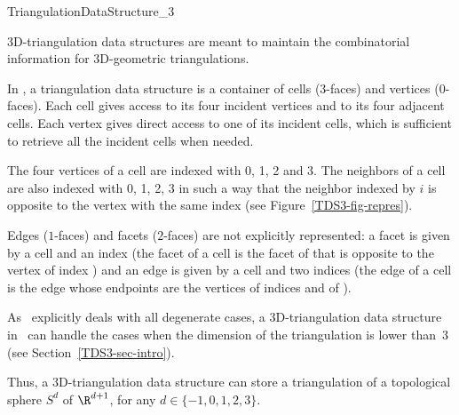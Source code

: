 

\begin{ccRefConcept}{TriangulationDataStructure_3}


\ccDefinition

3D-triangulation data structures are meant to maintain the
combinatorial information for 3D-geometric triangulations.

In \cgal, a triangulation data structure is a
container of cells ($3$-faces) and vertices ($0$-faces). Each cell gives
access to its four incident vertices and to its four adjacent
cells. Each vertex gives direct access to one of its incident cells, which is 
sufficient to retrieve all the incident cells when needed.

The four vertices of a cell are indexed with 0, 1, 2 and 3.  The
neighbors of a cell are also indexed with 0, 1, 2, 3 
in such a way that the neighbor indexed by $i$ is opposite to the vertex
with the same index (see Figure~\ref{TDS3-fig-repres}).

Edges ($1$-faces) and facets ($2$-faces) are not explicitly
represented: a facet is given by a cell and an index (the facet
 of a cell  is the facet of  that is opposite to
the vertex of index ) and an edge is given by a cell and two
indices (the edge  of a cell  is the edge
whose endpoints are the vertices of indices  and  of
). 

As \cgal\ explicitly deals with all degenerate cases, a
3D-triangulation data structure in \cgal\ can handle the cases when
the dimension of the triangulation is lower than~3 
(see Section~\ref{TDS3-sec-intro}).

Thus, a 3D-triangulation data structure can store a triangulation of a
topological sphere $S^d$ of $\R^{d+1}$, for any $d \in \{-1,0,1,2,3\}$. 

\bigskip


\end{ccRefConcept}
